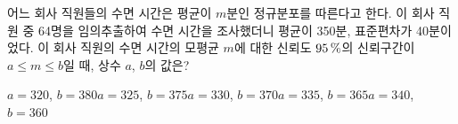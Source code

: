 어느 회사 직원들의 수면 시간은 평균이 $m$분인 정규분포를 따른다고 한다. 이 회사 직원 중 64명을 임의추출하여 수면 시간을 조사했더니 평균이 350분, 표준편차가 40분이었다. 이 회사 직원의 수면 시간의 모평균 $m$에 대한 신뢰도 $95\mkern3mu \%$의 신뢰구간이 $a\le m\le b$일 때, 상수 $a$, $b$의 값은? 
\begin{choicesii}{$a=320$, $b=380$}{$a=325$, $b=375$}{$a=330$, $b=370$}{$a=335$, $b=365$}{$a=340$, $b=360$}\end{choicesii}
